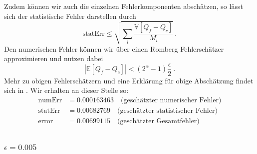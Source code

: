 Zudem können wir auch die einzelnen Fehlerkomponenten abschätzen, so lässt sich der statistische Fehler darstellen durch \[
\text{statErr} \leq \sqrt{\sum_l   \frac{\mathbb{V}[Q_f-Q_c]}{M_l}} \ . \] 
Den numerischen Fehler können wir über einen Romberg Fehlerschätzer approximieren und nutzen dabei  \[ \left| \mathbb{E}[Q_f-Q_c] \right| < (2^{\alpha}-1)\frac{\epsilon}{2} \ . \] Mehr zu obigen Fehlerschätzern und eine Erklärung für obige Abschätzung findet sich in \cite{giles_2015}.
Wir erhalten an dieser Stelle so: 
\begin{align*}
\text{numErr}  &=  0.000163463   \quad \text{(geschätzter numerischer Fehler)}\\
\text{statErr} &= 0.00682769  \quad  \text{(geschätzter statistischer Fehler)}\\
\text{error}   &= 0.00699115   \quad  \text{(geschätzter Gesamtfehler)}\\
\end{align*}



\subsubsection{$ \epsilon=0.005 $}

